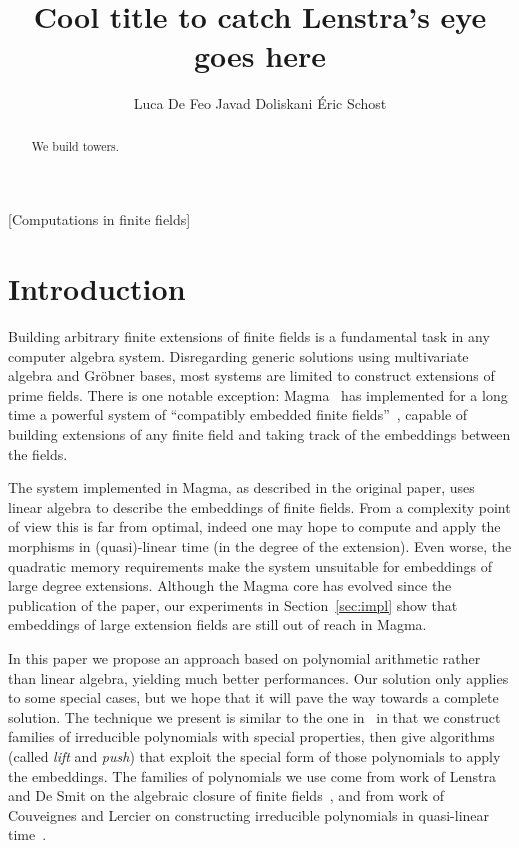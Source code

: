 \documentclass{sig-alternate}
\begin{document}
\title{Cool title to catch Lenstra's eye goes here}
\author{
  \alignauthor Luca De Feo
  \alignauthor Javad Doliskani
  \alignauthor Éric Schost
}

\maketitle
\begin{abstract}
  We build towers.
\end{abstract}
[Computations in finite fields]


\section{Introduction}
\label{sec:intro}

Building arbitrary finite extensions of finite fields is a fundamental
task in any computer algebra system. Disregarding generic solutions
using multivariate algebra and Gröbner bases, most systems are limited
to construct extensions of prime fields. There is one notable
exception: Magma~\cite{MAGMA} has implemented for a long time a
powerful system of ``compatibly embedded finite
fields''~\cite{bosma+cannon+steel97}, capable of building extensions
of any finite field and taking track of the embeddings between the
fields.

The system implemented in Magma, as described in the original paper,
uses linear algebra to describe the embeddings of finite fields. From
a complexity point of view this is far from optimal, indeed one may
hope to compute and apply the morphisms in (quasi)-linear time (in the
degree of the extension). Even worse, the quadratic memory
requirements make the system unsuitable for embeddings of large degree
extensions. Although the Magma core has evolved since the publication
of the paper, our experiments in Section~\ref{sec:impl} show that
embeddings of large extension fields are still out of reach in Magma.

In this paper we propose an approach based on polynomial arithmetic
rather than linear algebra, yielding much better performances. Our
solution only applies to some special cases, but we hope that it will
pave the way towards a complete solution. The technique we present is
similar to the one in~\cite{df+schost12} in that we construct families
of irreducible polynomials with special properties, then give
algorithms (called \emph{lift} and \emph{push}) that exploit the
special form of those polynomials to apply the embeddings. The
families of polynomials we use come from work of Lenstra and De Smit
on the algebraic closure of finite
fields~\cite{lenstra+desmit08-stdmodels}, and from work of Couveignes
and Lercier on constructing irreducible polynomials in quasi-linear
time~\cite{couveignes+lercier11}.
\end{document}

